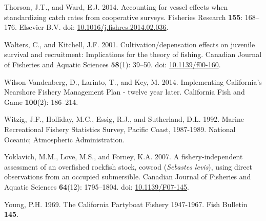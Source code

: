 \documentclass[
  english,
  a4paper,
]{article}
\newlength{\cslhangindent}
\newlength{\cslentryspacingunit} %
\newenvironment{CSLReferences}[2] %
 {%
  \setlength{\parindent}{0pt}
  \ifodd #1
  \let\oldpar\par
  \def\par{\hangindent=\cslhangindent\oldpar}
  \fi
  \setlength{\parskip}{#2\cslentryspacingunit}
 }%
 {}
\begin{document}
\begin{CSLReferences}{1}{0}
\leavevmode{}%
Thorson, J.T., and Ward, E.J. 2014. {Accounting for vessel effects when standardizing catch rates from cooperative surveys}. Fisheries Research \textbf{155}: 168--176. Elsevier B.V. doi: \href{https://doi.org/10.1016/j.fishres.2014.02.036}{10.1016/j.fishres.2014.02.036}.

\leavevmode{}%
Walters, C., and Kitchell, J.F. 2001. {Cultivation/depensation effects on juvenile survival and recruitment: Implications for the theory of fishing}. Canadian Journal of Fisheries and Aquatic Sciences \textbf{58}(1): 39--50. doi: \href{https://doi.org/10.1139/f00-160}{10.1139/f00-160}.

\leavevmode{}%
Wilson-Vandenberg, D., Larinto, T., and Key, M. 2014. {Implementing California's Nearshore Fishery Management Plan - twelve year later}. California Fish and Game \textbf{100}(2): 186--214.

\leavevmode{}%
Witzig, J.F., Holliday, M.C., Essig, R.J., and Sutherland, D.L. 1992. {Marine Recreational Fishery Statistics Survey, Pacific Coast, 1987-1989}. National Oceanic; Atmospheric Administration.

\leavevmode{}%
Yoklavich, M.M., Love, M.S., and Forney, K.A. 2007. {A fishery-independent assessment of an overfished rockfish stock, cowcod (\emph{Sebastes levis}), using direct observations from an occupied submersible}. Canadian Journal of Fisheries and Aquatic Sciences \textbf{64}(12): 1795--1804. doi: \href{https://doi.org/10.1139/F07-145}{10.1139/F07-145}.

\leavevmode{}%
Young, P.H. 1969. {The California Partyboat Fishery 1947-1967}. Fish Bulletin \textbf{145}.

\end{CSLReferences}
\end{document}
